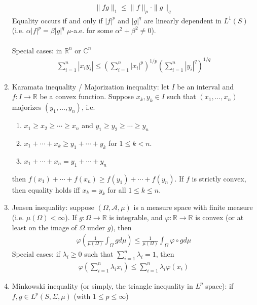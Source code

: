 \documentclass{treatise}
\begin{document}
\begin{shaded}
\begin{theorem}[Inequalities]
\begin{enumerate}
	\begin{align*}
	\| fg \|_1 \leq \| f \|_p \cdot \| g \|_q
	\end{align*}
	Equality occurs if and only if $|f|^p$ and $|g|^q$ are linearly dependent in $L^1 (S)$ (i.e. $\alpha |f|^p = \beta |g|^q$ $\mu$-a.e. for some $\alpha^2 + \beta^2 \neq 0$).
	\\
	\\
	Special cases: in $\mathbb{R}^n$ or $\mathbb{C}^n$
	\begin{align*}
	\sum_{i = 1}^n |x_i y_i| \leq \left( \sum_{i = 1}^n |x_i|^p \right)^{1/p} \left( \sum_{i = 1}^n |y_i|^q \right)^{1/q}
	\end{align*}
	\item Karamata inequality / Majorization inequality: let $I$ be an interval and $f: I \to \mathbb{R}$ be a convex function. Suppose $x_k, y_k \in I$ such that $(x_1, \hdots, x_n)$ majorizes $(y_1, \hdots, y_n)$, i.e.
	\begin{enumerate}
		\item $x_1 \geq x_2 \geq \cdots \geq x_n$ and $y_1 \geq y_2 \geq \cdots \geq y_n$
		\item $x_1 + \cdots + x_k \geq y_1 + \cdots + y_k$ for $1 \leq k < n$.
		\item $x_1 + \cdots + x_n = y_1 + \cdots + y_n$
	\end{enumerate}
	then $f(x_1) + \cdots + f(x_n) \geq f(y_1) + \cdots + f(y_n)$. If $f$ is strictly convex, then equality holds iff $x_k = y_k$ for all $1 \leq k \leq n$.
	\item Jensen inequality: suppose $(\Omega, \mathcal{A}, \mu)$ is a measure space with finite measure (i.e. $\mu(\Omega) < \infty$). If $g: \Omega \to \mathbb{R}$ is integrable, and $\varphi: \mathbb{R} \to \mathbb{R}$ is convex (or at least on the image of $\Omega$ under $g$), then
	\begin{align*}
	\varphi \left( \frac{1}{\mu(\Omega)} \int_\Omega g d \mu \right) \leq \frac{1}{\mu(\Omega)} \int_\Omega \varphi \circ g d \mu
	\end{align*}
	Special cases: if $\lambda_i \geq 0$ such that $\sum_{i = 1}^n \lambda_i = 1$, then
	\begin{align*}
	\varphi \left( \sum_{i = 1}^n \lambda_i x_i \right) \leq \sum_{i = 1}^n \lambda_i \varphi(x_i)
	\end{align*}
	\item Minkowski inequality (or simply, the triangle inequality in $L^p$ space): if $f, g \in L^p (S, \Sigma, \mu)$ (with $1 \leq p \leq \infty$)
	\begin{align*}

\end{align*}
\end{enumerate}
\end{theorem}
\end{shaded}
\end{document}
